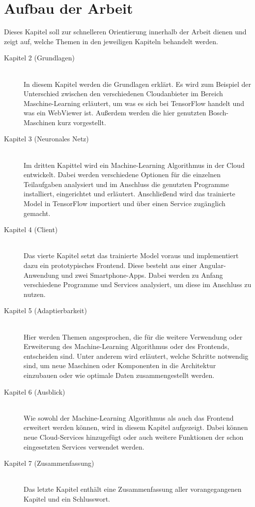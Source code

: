 \newpage

\section{Aufbau der Arbeit}
\label{sec:aufbauDerArbeit}
Dieses Kapitel soll zur schnelleren Orientierung innerhalb der Arbeit dienen und zeigt auf, welche Themen in den
jeweiligen Kapiteln behandelt werden.

\begin{description}

    \item[Kapitel 2 (Grundlagen)]\hfill \\
    In diesem Kapitel werden die Grundlagen erklärt. Es wird zum Beispiel der Unterschied zwischen den verschiedenen
    Cloudanbieter im Bereich Maschine-Learning erläutert, um was es sich bei TensorFlow handelt und was ein WebViewer
    ist. Außerdem werden die hier genutzten Bosch-Maschinen kurz vorgestellt.

    \item[Kapitel 3 (Neuronales Netz)]\hfill \\
    Im dritten Kapittel wird ein Machine-Learning Algorithmus in der Cloud entwickelt. Dabei werden verschiedene Optionen
    für die einzelnen Teilaufgaben analysiert und im Anschluss die genutzten Programme installiert, eingerichtet und
    erläutert. Anschließend wird das trainierte Model in TensorFlow importiert und über einen Service zugänglich gemacht.

    \item[Kapitel 4 (Client)]\hfill \\
    Das vierte Kapitel setzt das trainierte Model voraus und implementiert dazu ein prototypisches Frontend. Diese besteht
    aus einer Angular-Anwendung und zwei Smartphone-Apps. Dabei werden zu Anfang verschiedene Programme und Services
    analysiert, um diese im Anschluss zu nutzen.

    \item[Kapitel 5 (Adaptierbarkeit)]\hfill \\
    Hier werden Themen angesprochen, die für die weitere Verwendung oder Erweiterung des Machine-Learning Algorithmus
    oder des Frontends, entscheiden sind. Unter anderem wird erläutert, welche Schritte notwendig sind, um neue Maschinen
    oder Komponenten in die Architektur einzubauen oder wie optimale Daten zusammengestellt werden.

    \item[Kapitel 6 (Ausblick)]\hfill \\
    Wie sowohl der Machine-Learning Algorithmus als auch das Frontend erweitert werden können, wird in diesem Kapitel
    aufgezeigt. Dabei können neue Cloud-Services hinzugefügt oder auch weitere Funktionen der schon eingesetzten Services
    verwendet werden.

    \item[Kapitel 7 (Zusammenfassung)]\hfill \\
    Das letzte Kapitel enthält eine Zusammenfassung aller vorangegangenen Kapitel und ein Schlusswort.

\end{description}